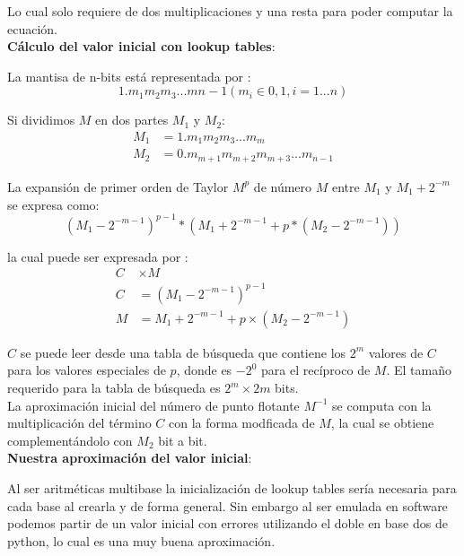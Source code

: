 \documentclass[a4paper,10pt,twocolumn]{article}
\begin{document}
\begin{itemize}
Lo cual solo requiere de dos multiplicaciones y una resta para poder computar la ecuación.\\

\textbf{Cálculo del valor inicial con lookup tables}:

La mantisa de n-bits está representada por : \\
\begin{equation}
1.m_1 m_2 m_3 ... m{n-1} (m_i \in {0,1}, i = 1... n)
\end{equation}

Si dividimos $M$ en dos partes $M_1$ y $M_2$: \\
\begin{align}
M_1 &= 1.m_1 m_2 m_3 ... m_m \\
M_2 &= 0. m_{m+1} m_{m+2} m_{m+3} ... m_{n-1}
\end{align}

La expansión de primer orden de Taylor $M^p$ de número $M$ entre $M_1$ y $M_1 + 2^{-m}$ se expresa como: \\
\begin{equation}
(M_1 - 2^{-m-1})^{p-1} * (M_1 + 2 ^{-m-1} + p * (M_2 - 2^{-m-1}))
\end{equation} 

la cual puede ser expresada por :
\begin{align*}
 C &\times M \\
 C &= (M_1 - 2 ^{-m-1})^{p-1} \\
 M &= M_1 + 2^{-m-1} + p \times (M_2 - 2^{-m-1})
\end{align*}

$C$ se puede leer desde una tabla de búsqueda que contiene los $2^m$ valores de $C$ para los valores especiales de $p$, donde es $-2^{0}$ para el recíproco de $M$. El tamaño requerido para la tabla de búsqueda es $2^m \times 2m$ bits. \\

La aproximación inicial del número de punto flotante $M^{-1}$ se computa con la multiplicación del término $C$ con la forma modficada de $M$, la cual se obtiene complementándolo con $M_2$ bit a bit. \\




\textbf{Nuestra aproximación del valor inicial}:

Al ser aritméticas multibase la inicialización de lookup tables sería necesaria para cada base al crearla y de forma general.
Sin embargo al ser emulada en software podemos partir de un valor inicial con errores utilizando el doble en base dos de python,
lo cual es una muy buena aproximación.


\end{itemize}
\end{document}
